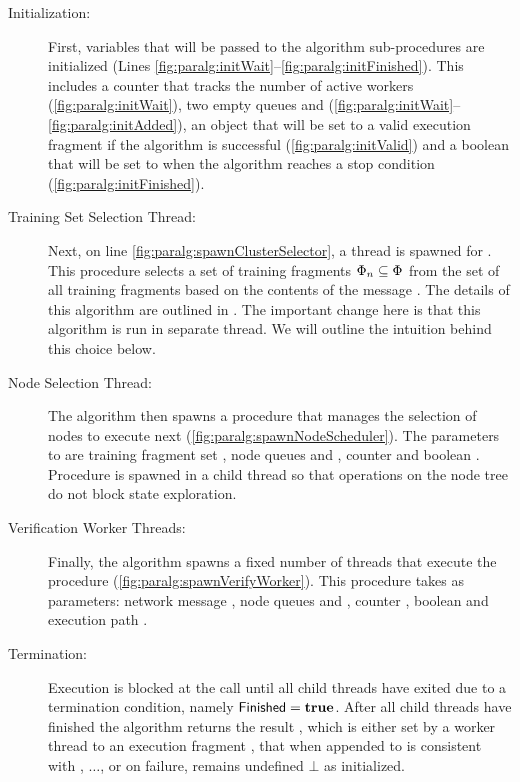 \begin{description}
\item[Initialization:]
First, variables that will be passed to the algorithm sub-procedures
are initialized (Lines
\ref{fig:paralg:initWait}--\ref{fig:paralg:initFinished}). This
includes a counter \activeCount that tracks the number of active
workers (\ref{fig:paralg:initWait}), two empty \NodeType queues
\readyQ  and \addedQ
(\ref{fig:paralg:initWait}--\ref{fig:paralg:initAdded}), an object
\validState that will be set to a valid execution fragment if the algorithm is
successful (\ref{fig:paralg:initValid}) and a boolean \verifyFinished
that will be set to \codeTrue when the algorithm reaches a stop condition
(\ref{fig:paralg:initFinished}). 

\item[Training Set Selection Thread:]
Next, on line \ref{fig:paralg:spawnClusterSelector}, a thread is
spawned for \clusterSelector. This procedure selects a set of training
fragments $\Phi_{n} \subseteq \Phi_{}$ from
the set of all training fragments \trainingFrags{} based on the
contents of the message \msg{\msgNmbr}. The details of this algorithm
are outlined in . The important change here is that
this algorithm is run in separate thread. We will outline the
intuition behind this choice below. 

\item[Node Selection Thread:] 
The algorithm then spawns a procedure that manages the selection of
nodes to execute next (\ref{fig:paralg:spawnNodeScheduler}). The
parameters to \nodeScheduler are training fragment set
\trainingFrags{\msgNmbr}, node queues \readyQ and \addedQ, counter
\activeCount and boolean \verifyFinished. Procedure \nodeScheduler is
spawned in a child thread so that operations on the node tree do not
block state exploration.

\item[Verification Worker Threads:]
Finally, the algorithm spawns a fixed number of threads that execute
the \verifyWorker procedure (\ref{fig:paralg:spawnVerifyWorker}). This
procedure takes as parameters: network message \msg{\msgNmbr}, node
queues \readyQ and \addedQ, counter \activeCount, boolean
\verifyFinished and execution path \validState. 

\item[Termination:]
Execution is blocked at the call \Sync until all child threads have
exited due to a termination condition, namely $\mathsf{Finished} =
\textbf{true}$. After all child threads
have finished the algorithm returns the result \validState, which is
either set by a worker thread to an execution fragment \newPath, that
when appended to 
is consistent with , $\ldots$, \msg{\msgNmbr} or on
failure, remains undefined $\bot$ as initialized.

\end{description}
